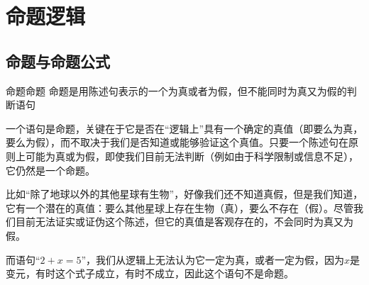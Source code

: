 \chapter{命题逻辑}
\section{命题与命题公式}
\begin{definition}{命题}{命题}
    命题是用陈述句表示的一个为真或者为假，但不能同时为真又为假的判断语句
\end{definition}
一个语句是命题，关键在于它是否在“逻辑上”具有一个确定的真值（即要么为真，要么为假），而不取决于我们是否知道或能够验证这个真值。只要一个陈述句在原则上可能为真或为假，即使我们目前无法判断（例如由于科学限制或信息不足），它仍然是一个命题。

比如“除了地球以外的其他星球有生物”，好像我们还不知道真假，但是我们知道，它有一个潜在的真值：要么其他星球上存在生物（真），要么不存在（假）。尽管我们目前无法证实或证伪这个陈述，但它的真值是客观存在的，不会同时为真又为假。

而语句“$2+x=5$”，我们从逻辑上无法认为它一定为真，或者一定为假，因为$x$是变元，有时这个式子成立，有时不成立，因此这个语句不是命题。

